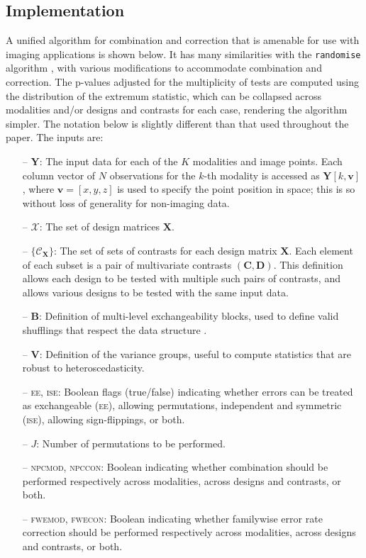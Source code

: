 \subsection{Implementation}
\label{sec:comb:implementation}

A unified algorithm for combination and correction that is amenable for use with imaging applications is shown below. It has many similarities with the \texttt{randomise} algorithm \citep{Winkler2014}, with various modifications to accommodate combination and correction. The p-values adjusted for the multiplicity of tests are computed using the distribution of the extremum statistic, which can be collapsed across modalities and/or designs and contrasts for each case, rendering the algorithm simpler. The notation below is slightly different than that used throughout the paper. The inputs are:

\begin{itemize}[leftmargin=*]
\item[--] $\mathbf{Y}$: The input data for each of the $K$ modalities and image points. Each column vector of $N$ observations for the $k$-th modality is accessed as $\mathbf{Y}[k,\mathbf{v}]$, where $\mathbf{v}=[x, y, z]$ is used to specify the point position in space; this is so without loss of generality for non-imaging data.
\item[--] $\mathcal{X}$:  The set of design matrices $\mathbf{X}$.
\item[--] $\{\mathcal{C}_\mathbf{X}\}$: The set of sets of contrasts for each design matrix $\mathbf{X}$. Each element of each subset is a pair of multivariate contrasts $(\mathbf{C},\mathbf{D})$. This definition allows each design to be tested with multiple such pairs of contrasts, and allows various designs to be tested with the same input data.
\item[--] $\mathbf{B}$: Definition of multi-level exchangeability blocks, used to define valid shufflings that respect the data structure \citep{Winkler2015}.
\item[--] $\mathbf{V}$: Definition of the variance groups, useful to compute statistics that are robust to heteroscedasticity.
\item[--] \textsc{ee}, \textsc{ise}: Boolean flags (true/false) indicating whether errors can be treated as exchangeable (\textsc{ee}), allowing permutations, independent and symmetric (\textsc{ise}), allowing sign-flippings, or both.
\item[--] $J$: Number of permutations to be performed.
\item[--] \textsc{npcmod}, \textsc{npccon}: Boolean indicating whether combination should be performed respectively across modalities, across designs and contrasts, or both.
\item[--] \textsc{fwemod}, \textsc{fwecon}: Boolean indicating whether familywise error rate correction should be performed respectively across modalities, across designs and contrasts, or both.
\end{itemize}

